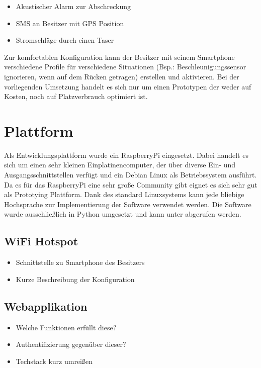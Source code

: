 \documentclass{sigchi}
\begin{document}
\begin{itemize} 
\item Akustischer Alarm zur Abschreckung
\item SMS an Besitzer mit GPS Position
\item Stromschläge durch einen Taser
\end{itemize}

Zur komfortablen Konfiguration kann der Besitzer mit seinem
Smartphone verschiedene Profile für verschiedene Situationen 
(Bsp.: Beschleunigungssensor ignorieren, wenn auf dem Rücken getragen)
erstellen und aktivieren. Bei der vorliegenden Umsetzung handelt
es sich nur um einen Prototypen der weder auf Kosten, noch auf
Platzverbrauch optimiert ist.

\section{Plattform}
Als Entwicklungsplattform wurde ein RaspberryPi eingesetzt. Dabei
handelt es sich um einen sehr kleinen Einplatinencomputer, der
über diverse Ein- und Ausgangsschnittstellen verfügt und ein
Debian Linux als Betriebssystem ausführt. Da es für das RaspberryPi
eine sehr große Community gibt eignet es sich sehr gut als
Prototying Plattform. Dank des standard Linuxsystems kann 
jede bliebige Hochsprache zur Implementierung der Software
verwendet werden. Die Software wurde ausschließlich in Python
umgesetzt und kann unter \cite{Github:Software} abgerufen werden.

\subsection{WiFi Hotspot}

\begin{itemize} 
  \item Schnittstelle zu Smartphone des Besitzers
  \item Kurze Beschreibung der Konfiguration
\end{itemize}

\subsection{Webapplikation}

\begin{itemize}
  \item Welche Funktionen erfüllt diese?
  \item Authentifizierung gegenüber dieser?
  \item Techstack kurz umreißen
\end{itemize}
\end{document}
